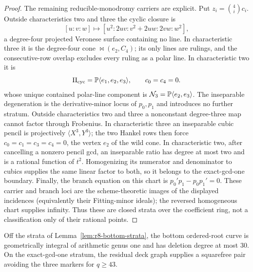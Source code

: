 \begin{proof}
The remaining reducible-monodromy carriers are explicit.  Put
$z_i=\binom4i c_i$.  Outside characteristics two and three the cyclic
closure is
\begin{equation}\label{eq:r8-cyclic-veronese}
 [u:v:w]\longmapsto
 [u^2:2uv:v^2+2uw:2vw:w^2],
\end{equation}
a degree-four projected Veronese surface containing no line.  In
characteristic three it is the degree-four cone
$\Join(e_2,C_4)$; its only lines are rulings, and the consecutive-row
overlap excludes every ruling as a polar line.  In characteristic two
it is
\begin{equation}\label{eq:r8-cyclic-binary}
 \Pi_{\rm cyc}=\mathbb P\langle e_1,e_2,e_3\rangle,\qquad c_0=c_4=0.
\end{equation}
whose unique contained polar-line component is
$\mathcal N_3=\mathbb P\langle e_2,e_3\rangle$.  The inseparable degeneration is
the derivative-minor locus of $p_0,p_1$ and introduces no further
stratum.  Outside characteristics two and three a nonconstant
degree-three map cannot factor through Frobenius.  In characteristic
three an inseparable cubic pencil is projectively
$\langle X^3,Y^3\rangle$; the two Hankel rows then force
$c_0=c_1=c_3=c_4=0$, the vertex $e_2$ of the wild cone.  In
characteristic two, after cancelling a nonzero pencil gcd, an inseparable
ratio has degree at most two and is a rational function of $t^2$.
Homogenizing its numerator and denominator to cubics supplies the
same linear factor to both, so it belongs to the exact-gcd-one
boundary.  Finally, the branch equation on this chart is
$p_0'p_1-p_0p_1'=0$.  These carrier and branch loci are the
scheme-theoretic images of the displayed incidences (equivalently their
Fitting-minor ideals); the reversed homogeneous chart supplies infinity.
Thus these are closed strata over the coefficient ring, not a
classification only of their rational points.
\end{proof}

\begin{lemma}\label{lem:r8-monodromy}%
%
Off the strata of Lemma~\ref{lem:r8-bottom-strata}, the bottom
ordered-root curve is geometrically integral of arithmetic genus one
and has deletion degree at most $30$.  On the exact-gcd-one stratum,
the residual deck graph supplies a squarefree pair avoiding the three
markers for $q\geq43$.
\end{lemma}

